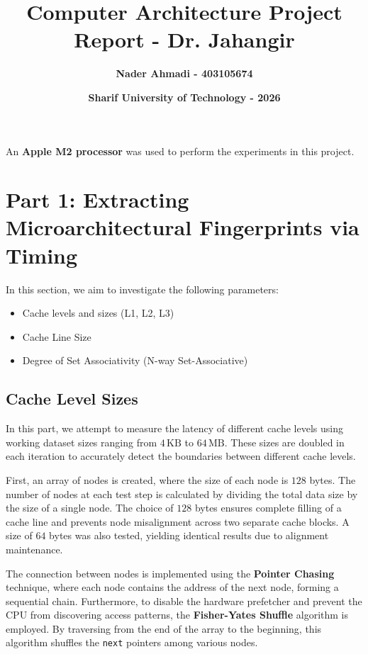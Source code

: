 \documentclass{article}
\title{\textbf{Computer Architecture Project Report - Dr. Jahangir}} %
\author{\textbf{Nader Ahmadi - 403105674}} %
\date{\textbf{Sharif University of Technology - 2026}} %
\begin{document}
	
	\maketitle %
	
	\vline
	
	
	\begin{tcolorbox}[colback=blue!5!white, colframe=blue!75!black, title=Notes]
		An \textbf{Apple M2 processor} was used to perform the experiments in this project.
	\end{tcolorbox}
	
	
	\setcounter{section}{0}
	\section{Part 1: Extracting Microarchitectural Fingerprints via Timing} %
	In this section, we aim to investigate the following parameters:
	\begin{itemize}
		\item Cache levels and sizes (L1, L2, L3)
		\item Cache Line Size
		\item Degree of Set Associativity (N-way Set-Associative)
	\end{itemize}
	
	
	\subsection{Cache Level Sizes}
	
	In this part, we attempt to measure the latency of different cache levels using working dataset sizes ranging from $4\,\text{KB}$ to $64\,\text{MB}$. These sizes are doubled in each iteration to accurately detect the boundaries between different cache levels.
	
	First, an array of nodes is created, where the size of each node is $128$ bytes. The number of nodes at each test step is calculated by dividing the total data size by the size of a single node. The choice of $128$ bytes ensures complete filling of a cache line and prevents node misalignment across two separate cache blocks. A size of $64$ bytes was also tested, yielding identical results due to alignment maintenance.
	
	The connection between nodes is implemented using the \textbf{Pointer Chasing} technique, where each node contains the address of the next node, forming a sequential chain. Furthermore, to disable the hardware prefetcher and prevent the CPU from discovering access patterns, the \textbf{Fisher-Yates Shuffle} algorithm is employed. By traversing from the end of the array to the beginning, this algorithm shuffles the \texttt{next} pointers among various nodes.
	
\end{document}
